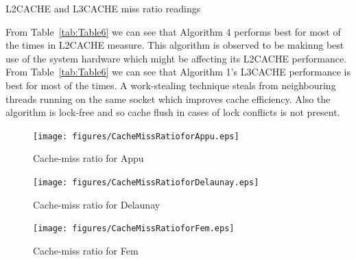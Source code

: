 \begin{itemize}
\begin{table}[th]
\caption{\capfont L2CACHE and L3CACHE miss ratio readings }
\label{tab:Table6}
\end{table}
From Table~\ref{tab:Table6} we can see that Algorithm 4 performs best for
most of the times in L2CACHE measure.  This algorithm is observed
to be makinng best use of the system hardware which might be affecting
its L2CACHE performance.
From Table~\ref{tab:Table6} we can see that Algorithm 1's L3CACHE 
performance is best for most of the times.  A work-stealing 
technique steals from neighbouring threads running on the same 
socket which improves cache efficiency. Also the algorithm is lock-free and
so cache flush in cases of lock conflicts is not present.
\begin{figure}[t]
    \centering
    \texttt{[image: figures/CacheMissRatioforAppu.eps]}
    \caption{Cache-miss ratio for Appu}
    \label{fig:Appu-Cache Miss}
\end{figure}

\begin{figure}[t]
    \centering
    \texttt{[image: figures/CacheMissRatioforDelaunay.eps]}
    \caption{Cache-miss ratio for Delaunay}
    \label{fig:Delaunay-Cache Miss}
\end{figure}

\begin{figure}[t]
    \centering
    \texttt{[image: figures/CacheMissRatioforFem.eps]}
    \caption{Cache-miss ratio for Fem}
    \label{fig:Fem-Cache Miss}
\end{figure}


\end{itemize}

